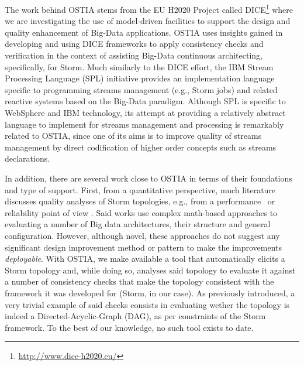 
The work behind OSTIA stems from the EU H2020 Project called DICE\footnote{\url{http://www.dice-h2020.eu/}} where we are investigating the use of model-driven facilities to support the design and quality enhancement of Big-Data applications. OSTIA uses insights gained in developing and using DICE frameworks to apply consistency checks and verification in the context of assisting Big-Data continuous architecting, specifically, for Storm. Much similarly to the DICE effort, the IBM Stream Processing Language (SPL) initiative \cite{ibmspl} provides an implementation language specific to programming streams management (e.g., Storm jobs) and related reactive systems based on the Big-Data paradigm. Although SPL is specific to WebSphere and IBM technology, its attempt at providing a relatively abstract language to implement for streams management and processing is remarkably related to OSTIA, since one of its aims is to improve quality of streams management by direct codification of higher order concepts such as streams declarations.

In addition, there are several work close to OSTIA in terms of their foundations and type of support. 
First, from a quantitative perspective, much literature discusses quality analyses of Storm topologies, e.g., from a performance~\cite{perfbd} or reliability point of view \cite{bigdatareliab}. Said works use complex math-based approaches to evaluating a number of Big data architectures, their structure and general configuration. However, although novel, these approaches do not suggest any significant design improvement method or pattern to make the improvements \emph{deployable}. With OSTIA, we make available a tool that automatically elicits a Storm topology and, while doing so, analyses said topology to evaluate it against a number of consistency checks that make the topology consistent with the framework it was developed for (Storm, in our case). As previously introduced, a very trivial example of said checks consists in evaluating wether the topology is indeed a Directed-Acyclic-Graph (DAG), as per constraints of the Storm framework.  To the best of our knowledge, no such tool exists to date. \\

